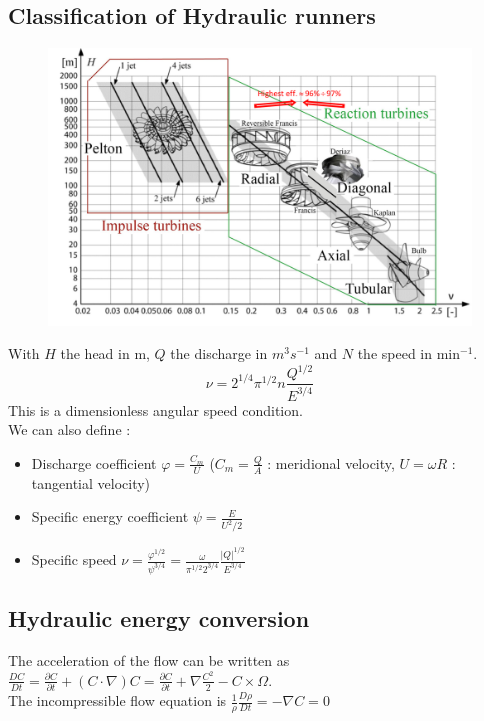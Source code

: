 \documentclass[../main.tex]{subfiles}
\begin{document}
\subsection{Classification of Hydraulic runners}
\begin{figure}[hbt!]
    \centering
    \includegraphics[width=0.8\linewidth]{IMAGES/Hydraulic/Hydrau1.png}
\end{figure}

With $H$ the head in m, $Q$ the discharge in $m^3 s^{-1}$ and $N$ the speed in min${}^{-1}$.\begin{equation}
    \nu = 2^{1/4} \pi^{1/2} n \frac{Q^{1/2}}{E^{3/4}}
\end{equation}
This is a dimensionless angular speed condition. \\
We can also define : \begin{itemize}
    \item Discharge coefficient $\varphi = \frac{C_m}{U}$ ($C_m = \frac{Q}{A}$ : meridional velocity, $U = \omega R$ : tangential velocity)
    \item Specific energy coefficient $\psi = \frac{E}{U^2/2}$
    \item Specific speed $\nu = \frac{\varphi^{1/2}}{\psi^{3/4}} = \frac{\omega}{\pi^{1/2} 2^{3/4}} \frac{\lvert Q \rvert^{1/2}}{E^{3/4}}$
\end{itemize}

\subsection{Hydraulic energy conversion}
The acceleration of the flow can be written as $\frac{DC}{Dt} = \frac{\partial C}{\partial t} + (C\cdot \nabla) C = \frac{\partial C}{\partial t} + \nabla \frac{C^2}{2}- C\times \Omega$.\\

The incompressible flow equation is $\frac{1}{\rho} \frac{D\rho}{Dt} = -\nabla C = 0$\\
\end{document}
